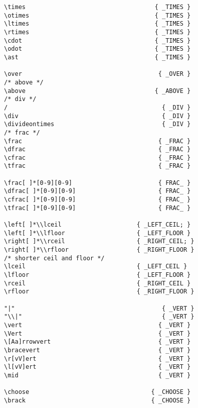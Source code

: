 \label{lexerTokens}
\begin{verbatim}
\times                                    { _TIMES }
\otimes                                   { _TIMES }
\ltimes                                   { _TIMES }
\rtimes                                   { _TIMES }
\cdot                                     { _TIMES }
\odot                                     { _TIMES }
\ast                                      { _TIMES }

\over                                      { _OVER }
/* above */
\above                                    { _ABOVE }
/* div */
/                                           { _DIV }
\div                                        { _DIV }
\divideontimes                              { _DIV }
/* frac */
\frac                                      { _FRAC }
\dfrac                                     { _FRAC }
\cfrac                                     { _FRAC }
\tfrac                                     { _FRAC }

\frac[ ]*[0-9][0-9]                        { FRAC_ }
\dfrac[ ]*[0-9][0-9]                       { FRAC_ } 
\cfrac[ ]*[0-9][0-9]                       { FRAC_ } 
\tfrac[ ]*[0-9][0-9]                       { FRAC_ } 

\left[ ]*\\lceil                     { _LEFT_CEIL; }
\left[ ]*\\lfloor                    { _LEFT_FLOOR }
\right[ ]*\\rceil                    { _RIGHT_CEIL; }
\right[ ]*\\rfloor                   { _RIGHT_FLOOR }
/* shorter ceil and floor */
\lceil                               { _LEFT_CEIL }
\lfloor                              { _LEFT_FLOOR }
\rceil                               { _RIGHT_CEIL }
\rfloor                              { _RIGHT_FLOOR }

"|"                                         { _VERT }
"\\|"                                       { _VERT }
\vert                                      { _VERT }
\Vert                                      { _VERT }
\[Aa]rrowvert                              { _VERT }
\bracevert                                 { _VERT }
\r[vV]ert                                  { _VERT }
\l[vV]ert                                  { _VERT }
\mid                                       { _VERT }

\choose                                  { _CHOOSE }
\brack                                   { _CHOOSE }


\end{verbatim}

